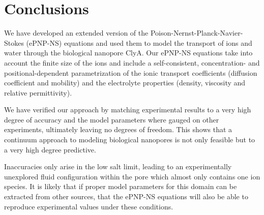\documentclass[journal=ancac3,manuscript=article,etalmode=truncate,maxauthors=0,layout=onecolumn]{achemso}
\begin{document}






\section{Conclusions}\label{sec:conclusions}

We have developed an extended version of the Poison-Nernst-Planck-Navier-Stokes (ePNP-NS) equations and used
them to model the transport of ions and water through the biological nanopore ClyA. Our ePNP-NS equations take
into account the finite size of the ions and include a self-consistent, concentration- and
positional-dependent parametrization of the ionic transport coefficients (diffusion coefficient and mobility)
and the electrolyte properties (density, viscosity and relative permittivity).

We have verified our approach by matching experimental results to a very high degree of accuracy and the
model parameters where gauged on other experiments, ultimately leaving no degrees of freedom. This shows that
a continuum approach to modeling biological nanopores is not only feasible but to a very high degree
predictive.

Inaccuracies only arise in the low salt limit, leading to an experimentally unexplored fluid configuration
within the pore which almost only contains one ion species. It is likely that if proper model parameters for
this domain can be extracted from other sources, that the ePNP-NS equations will also be able to reproduce
experimental values under these conditions.
\end{document}
